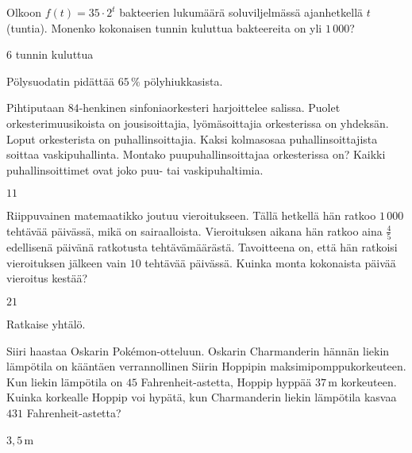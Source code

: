 \begin{multicols}{2}
\begin{tehtava}
Olkoon $f(t) = 35 \cdot 2^t$ bakteerien lukumäärä soluviljelmässä ajanhetkellä $t$ (tuntia). Monenko kokonaisen tunnin kuluttua bakteereita on yli $1\,000$?
	\begin{vastaus}
	$6$ tunnin kuluttua
	\end{vastaus}
\end{tehtava}

\begin{tehtava}
	Pölysuodatin pidättää $65\,\%$ pölyhiukkasista.
\begin{vastaus}
\end{vastaus}
\end{tehtava}

\begin{tehtava}
	Pihtiputaan $84$-henkinen sinfoniaorkesteri harjoittelee salissa. Puolet orkesterimuusikoista on jousisoittajia, lyömäsoittajia orkesterissa on yhdeksän. Loput orkesterista on puhallinsoittajia. Kaksi kolmasosaa puhallinsoittajista soittaa vaskipuhallinta. Montako puupuhallinsoittajaa orkesterissa on? Kaikki puhallinsoittimet ovat joko puu- tai vaskipuhaltimia.
	\begin{vastaus}
	$11$
	\end{vastaus}
\end{tehtava}

\begin{tehtava}
	Riippuvainen matemaatikko joutuu vieroitukseen. Tällä hetkellä hän ratkoo $1\,000$ tehtävää päivässä, mikä on sairaalloista. Vieroituksen aikana hän ratkoo aina $\frac{4}{5}$ edellisenä päivänä ratkotusta tehtävämäärästä. Tavoitteena on, että hän ratkoisi vieroituksen jälkeen vain $10$ tehtävää päivässä. Kuinka monta kokonaista päivää vieroitus kestää?
	\begin{vastaus}
	$21$
	\end{vastaus}
\end{tehtava}

\begin{tehtava}
	Ratkaise yhtälö.
	\begin{vastaus}
	\end{vastaus}
\end{tehtava}

\begin{tehtava}
Siiri haastaa Oskarin Pokémon-otteluun. Oskarin Charmanderin hännän liekin lämpötila on kääntäen verrannollinen Siirin Hoppipin maksimipomppukorkeuteen. Kun liekin lämpötila on $45$ Fahrenheit-astetta, Hoppip hyppää $37$\,m korkeuteen. Kuinka korkealle Hoppip voi hypätä, kun Charmanderin liekin lämpötila kasvaa $431$ Fahrenheit-astetta? %
	\begin{vastaus}
	$3,5$\,m
	\end{vastaus}
\end{tehtava}

\end{multicols}

